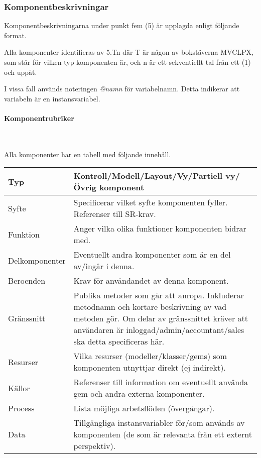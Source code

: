 \documentclass[a4paper, twoside, 11pt, titlepage]{article}
\begin{document}
		\subsubsection{Komponentbeskrivningar}


		Komponentbeskrivningarna under punkt fem (5) är upplagda enligt följande format.

		Alla komponenter identifieras av 5.Tn där T är någon av bokstäverna MVCLPX, som står för vilken typ komponenten är, och n är ett sekventiellt tal från ett (1) och uppåt.

		I vissa fall används noteringen \emph{@namn} för variabelnamn. Detta indikerar att variabeln är en instansvariabel.

			\paragraph{Komponentrubriker}\

			Alla komponenter har en tabell med följande innehåll.

			\begin {table} [ht] \begin{tabular} { p{2.6cm} p{12.5cm} }
				\hline
				{Typ} & {Kontroll/Modell/Layout/Vy/Partiell vy/Övrig komponent} \\
				\hline
				{Syfte} & {Specificerar vilket syfte komponenten fyller. Referenser till SR-krav.} \\
				\hline
				{Funktion} & {Anger vilka olika funktioner komponenten bidrar med.} \\
				\hline
				{Delkomponenter} & {Eventuellt andra komponenter som är en del av/ingår i denna.} \\
				\hline
				{Beroenden} & {Krav för användandet av denna komponent.} \\
				\hline
				{Gränssnitt} & {Publika metoder som går att anropa. Inkluderar metodnamn och kortare beskrivning av vad metoden gör. Om delar av gränssnittet kräver att användaren är inloggad/admin/accountant/sales ska detta specificeras här.} \\
				\hline
				{Resurser} & {Vilka resurser (modeller/klasser/gems) som komponenten utnyttjar direkt (ej indirekt).} \\
				\hline
				{Källor} & {Referenser till information om eventuellt använda gem och andra externa komponenter.} \\
				\hline
				{Process} & {Lista möjliga arbetsflöden (övergångar).} \\
				\hline
				{Data} & {Tillgängliga instansvariabler för/som används av komponenten (de som är relevanta från ett externt perspektiv).} \\
				\hline
			\end{tabular} \end{table} \FloatBarrier
\end{document}
